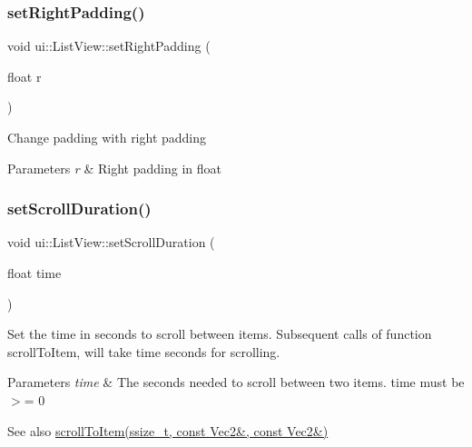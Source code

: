 \subsubsection{\texorpdfstring{set\+Right\+Padding()}{setRightPadding()}}
{\footnotesize\ttfamily void ui\+::\+List\+View\+::set\+Right\+Padding (\begin{DoxyParamCaption}\item[{float}]{r }\end{DoxyParamCaption})}

Change padding with right padding 
\begin{DoxyParams}{Parameters}
{\em r} & Right padding in float \\
\hline
\end{DoxyParams}
\mbox{\label{classui_1_1ListView_a9f0e93625317fa86700986bed97efc88}} 
\subsubsection{\texorpdfstring{set\+Scroll\+Duration()}{setScrollDuration()}\hspace{0.1cm}{\footnotesize\ttfamily [1/2]}}
{\footnotesize\ttfamily void ui\+::\+List\+View\+::set\+Scroll\+Duration (\begin{DoxyParamCaption}\item[{float}]{time }\end{DoxyParamCaption})}

Set the time in seconds to scroll between items. Subsequent calls of function \textquotesingle{}scroll\+To\+Item\textquotesingle{}, will take \textquotesingle{}time\textquotesingle{} seconds for scrolling. 
\begin{DoxyParams}{Parameters}
{\em time} & The seconds needed to scroll between two items. \textquotesingle{}time\textquotesingle{} must be $>$= 0 \\
\hline
\end{DoxyParams}
\begin{DoxySeeAlso}{See also}
\hyperlink{classui_1_1ListView_aeb284de1ebb4ae2e30c6c478d6e1d1a0}{scroll\+To\+Item(ssize\+\_\+t, const Vec2\&, const Vec2\&)} 
\end{DoxySeeAlso}
\mbox{\label{classui_1_1ListView_a9f0e93625317fa86700986bed97efc88}} 
